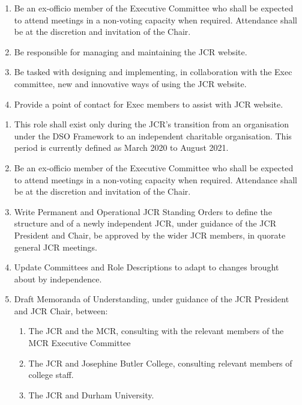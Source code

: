 \begin{enumerate}
    \item Be an ex-officio member of the Executive Committee who shall be expected to attend meetings in a non-voting capacity when required. Attendance shall be at the discretion and invitation of the Chair.
    \item Be responsible for managing and maintaining the JCR website.
    \item Be tasked with designing and implementing, in collaboration with the Exec committee, new and innovative ways of using the JCR website.
    \item Provide a point of contact for Exec members to assist with JCR website.
\end{enumerate}

\begin{enumerate}
    \item This role shall exist only during the JCR's transition from an organisation under the DSO Framework to an independent charitable organisation. This period is currently defined as March 2020 to August 2021.
    \item Be an ex-officio member of the Executive Committee who shall be expected to attend meetings in a non-voting capacity when required. Attendance shall be at the discretion and invitation of the Chair.
    \item Write Permanent and Operational JCR Standing Orders to define the structure and of a newly independent JCR, under guidance of the JCR President and Chair, be approved by the wider JCR members, in quorate general JCR meetings.
    \item Update Committees and Role Descriptions to adapt to changes brought about by independence.
    \item Draft Memoranda of Understanding, under guidance of the JCR President and JCR Chair, between:
    \begin{enumerate}
        \item The JCR and the MCR, consulting with the relevant members of the MCR Executive Committee
        \item The JCR and Josephine Butler College, consulting relevant members of college staff.
        \item The JCR and Durham University.
    \end{enumerate}
\end{enumerate}

